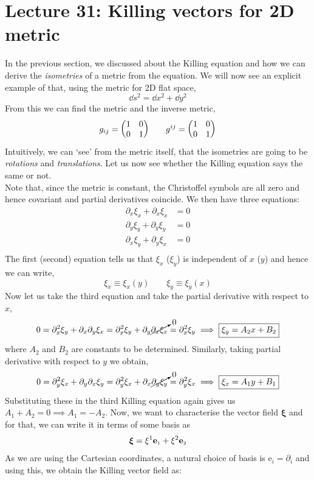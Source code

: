 \section*{Lecture 31: Killing vectors for 2D metric}
In the previous section, we discussed about the Killing equation and how we can derive the \textit{isometries} of a metric from the equation. We will now see an explicit example of that, using the metric for 2D flat space,
$$\dd s^2 = \dd x^2+\dd y^2$$
From this we can find the metric and the inverse metric,
$$g_{ij} =\mqty(1 & 0 \\ 0 & 1)\qquad  g^{ij} =\mqty(1 & 0 \\ 0 & 1)$$
Intuitively, we can `see' from the metric itself, that the isometries are going to be \textit{rotations} and \textit{translations}. Let us now see whether the Killing equation says the same or not.\\[0.2cm]
Note that, since the metric is constant, the Christoffel symbols are all zero and hence covariant and partial derivatives coincide. We then have three equations:
\begin{align*}
    \partial_x \xi_x + \partial_x \xi_x &= 0\\
 \partial_y \xi_y + \partial_y \xi_y &= 0\\
  \partial_x \xi_y + \partial_y \xi_x &= 0\\
\end{align*}
The first (second) equation tells us that $\xi_x$ ($\xi_y$) is independent of $x$ ($y$) and hence we can write, 
$$\xi_x\equiv \xi_x(y)\qquad \xi_y\equiv \xi_y(x)$$
Now let us take the third equation and take the partial derivative with respect to $x$, 
$$0=\partial^2_x \xi_y + \partial_x\partial_y \xi_x = \partial^2_x \xi_y + \partial_y \cancelto{0}{\partial_x\xi_x} = \partial^2_x \xi_y \implies \boxed{\xi_y = A_2 x+B_2}$$
where $A_2$ and $B_2$ are constants to be determined. Similarly, taking partial derivative with respect to $y$ we obtain,
$$0=\partial^2_y \xi_x + \partial_y\partial_x \xi_y = \partial^2_y \xi_x + \partial_x \cancelto{0}{\partial_y\xi_y} = \partial^2_y \xi_x \implies \boxed{\xi_x = A_1 y+B_1}$$
Substituting these in the third Killing equation again gives us $A_1+A_2=0\implies A_1=-A_2$. Now, we want to characterise the vector field $\boldsymbol{\xi}$ and for that, we can write it in terms of some basis as $$\boldsymbol{\xi} = \xi^1 {\boldsymbol{\mathrm{e}}_{\text{\tiny 1}}} +\xi^2 \boldsymbol{\mathrm{e}}_{\text{\tiny 2}}$$
As we are using the Cartesian coordinates, a natural choice of basis is $\boldsymbol{\mathrm{e}}_i = \partial_i$ and using this, we obtain the Killing vector field as:
